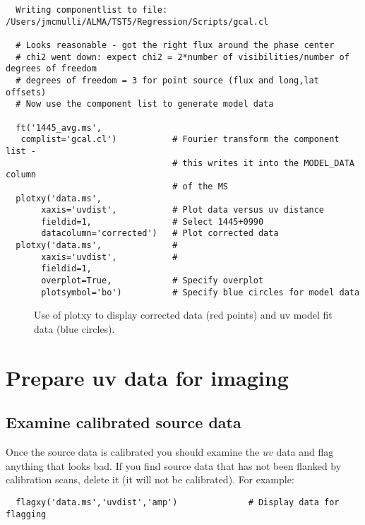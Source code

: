 \begin{verbatim}
  Writing componentlist to file: /Users/jmcmulli/ALMA/TST5/Regression/Scripts/gcal.cl

  # Looks reasonable - got the right flux around the phase center
  # chi2 went down: expect chi2 = 2*number of visibilities/number of degrees of freedom
  # degrees of freedom = 3 for point source (flux and long,lat offsets)
  # Now use the component list to generate model data

  ft('1445_avg.ms',  
   complist='gcal.cl')           # Fourier transform the component list -
                                 # this writes it into the MODEL_DATA column
                                 # of the MS
  plotxy('data.ms',
       xaxis='uvdist',           # Plot data versus uv distance
       fieldid=1,                # Select 1445+0990
       datacolumn='corrected')   # Plot corrected data
  plotxy('data.ms',              #
       xaxis='uvdist',           #
       fieldid=1, 
       overplot=True,            # Specify overplot
       plotsymbol='bo')          # Specify blue circles for model data
\end{verbatim}
\normalsize

\begin{figure}[h!]
\caption{\label{fig:modelfit} Use of plotxy to display corrected data
  (red points) and uv model fit data (blue circles).} 
\hrulefill
\end{figure}

\section{Prepare uv data for imaging}
\label{section:synth.prepare.for.imaging}

\subsection{Examine calibrated source data}
\label{subsection:synth.edit.src}

Once the source data is calibrated you should examine the $uv$ data
and flag anything that looks bad.  If you find source data that has
not been flanked by calibration scans, delete it (it will not be
calibrated).  For example:

\small
\begin{verbatim}
  flagxy('data.ms','uvdist','amp')              # Display data for flagging
\end{verbatim}
\normalsize

